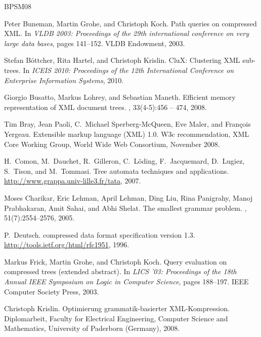 \documentclass[12pt]{llncs}
\begin{document}
\newcommand{\etalchar}[1]{}
\begin{thebibliography}{BPSM{\etalchar{+}}08}

Peter Buneman, Martin Grohe, and Christoph Koch.
\newblock Path queries on compressed {XML}.
\newblock In {\em VLDB 2003: Proceedings of the 29th international conference
  on very large data bases}, pages 141--152. VLDB Endowment, 2003.

Stefan B{\"o}ttcher, Rita Hartel, and Christoph Krislin.
\newblock Clu{X}: Clustering {XML} sub-trees.
\newblock In {\em ICEIS 2010: Proceedings of the 12th International Conference
  on Enterprise Information Systems}, 2010.

Giorgio Busatto, Markus Lohrey, and Sebastian Maneth.
\newblock Efficient memory representation of {XML} document trees.
, 33(4-5):456 -- 474, 2008.

\bibitem[BPSM{\etalchar{+}}08]{Yergeau08}
Tim Bray, Jean Paoli, C.~Michael Sperberg-McQueen, Eve Maler, and Fran\c{c}ois
  Yergeau.
\newblock Extensible markup language ({XML}) 1.0.
\newblock W3c recommendation, XML Core Working Group, World Wide Web
  Consortium, November 2008.

\bibitem[CDG{\etalchar{+}}07]{tata2007}
H.~Comon, M.~Dauchet, R.~Gilleron, C.~L\"oding, F.~Jacquemard, D.~Lugiez,
  S.~Tison, and M.~Tommasi.
\newblock Tree automata techniques and applications.
\newblock \url{http://www.grappa.univ-lille3.fr/tata}, 2007.

\bibitem[CLL{\etalchar{+}}05]{Charikar05smallest}
Moses Charikar, Eric Lehman, April Lehman, Ding Liu, Rina Panigrahy, Manoj
  Prabhakaran, Amit Sahai, and Abhi Shelat.
\newblock The smallest grammar problem.
, 51(7):2554--2576, 2005.

P.~Deutsch.
 compressed data format specification version 1.3.
\newblock \url{http://tools.ietf.org/html/rfc1951}, 1996.

Markus Frick, Martin Grohe, and Christoph Koch.
\newblock Query evaluation on compressed trees (extended abstract).
\newblock In {\em LICS '03: Proceedings of the 18th Annual IEEE Symposium on
  Logic in Computer Science}, pages 188--197. IEEE Computer Society Press,
  2003.

Christoph Krislin.
\newblock Optimierung grammatik-basierter {XML}-{K}ompression.
\newblock Diplomarbeit, Faculty for Electrical Engineering, Computer Science
  and Mathematics, University of Paderborn (Germany), 2008.


\end{thebibliography}
\end{document}
